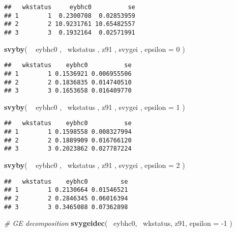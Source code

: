\documentclass[]{book}
\newenvironment{Shaded}{\begin{snugshade}}{\end{snugshade}}
\newcommand{\KeywordTok}[1]{\textcolor[rgb]{0.13,0.29,0.53}{\textbf{{#1}}}}
\newcommand{\DataTypeTok}[1]{\textcolor[rgb]{0.13,0.29,0.53}{{#1}}}
\newcommand{\DecValTok}[1]{\textcolor[rgb]{0.00,0.00,0.81}{{#1}}}
\newcommand{\StringTok}[1]{\textcolor[rgb]{0.31,0.60,0.02}{{#1}}}
\newcommand{\CommentTok}[1]{\textcolor[rgb]{0.56,0.35,0.01}{\textit{{#1}}}}
\newcommand{\NormalTok}[1]{{#1}}
\theoremstyle{definition}
\theoremstyle{definition}
\theoremstyle{remark}
\begin{document}
\begin{verbatim}
##   wkstatus     eybhc0          se
## 1        1  0.2300708  0.02853959
## 2        2 10.9231761 10.65482557
## 3        3  0.1932164  0.02571991
\end{verbatim}

\begin{Shaded}
\begin{Highlighting}[]
\KeywordTok{svyby}\NormalTok{( ~}\StringTok{ }\NormalTok{eybhc0 , ~wkstatus , z91 , svygei , }\DataTypeTok{epsilon =} \DecValTok{0} \NormalTok{)}
\end{Highlighting}
\end{Shaded}

\begin{verbatim}
##   wkstatus    eybhc0          se
## 1        1 0.1536921 0.006955506
## 2        2 0.1836835 0.014740510
## 3        3 0.1653658 0.016409770
\end{verbatim}

\begin{Shaded}
\begin{Highlighting}[]
\KeywordTok{svyby}\NormalTok{( ~}\StringTok{ }\NormalTok{eybhc0 , ~wkstatus , z91 , svygei , }\DataTypeTok{epsilon =} \DecValTok{1} \NormalTok{)}
\end{Highlighting}
\end{Shaded}

\begin{verbatim}
##   wkstatus    eybhc0          se
## 1        1 0.1598558 0.008327994
## 2        2 0.1889909 0.016766120
## 3        3 0.2023862 0.027787224
\end{verbatim}

\begin{Shaded}
\begin{Highlighting}[]
\KeywordTok{svyby}\NormalTok{( ~}\StringTok{ }\NormalTok{eybhc0 , ~wkstatus , z91 , svygei , }\DataTypeTok{epsilon =} \DecValTok{2} \NormalTok{)}
\end{Highlighting}
\end{Shaded}

\begin{verbatim}
##   wkstatus    eybhc0         se
## 1        1 0.2130664 0.01546521
## 2        2 0.2846345 0.06016394
## 3        3 0.3465088 0.07362898
\end{verbatim}

\begin{Shaded}
\begin{Highlighting}[]
\CommentTok{# GE decomposition}
\KeywordTok{svygeidec}\NormalTok{( ~eybhc0, ~wkstatus, z91, }\DataTypeTok{epsilon =} \NormalTok{-}\DecValTok{1} \NormalTok{)}
\end{Highlighting}
\end{Shaded}
\end{document}
